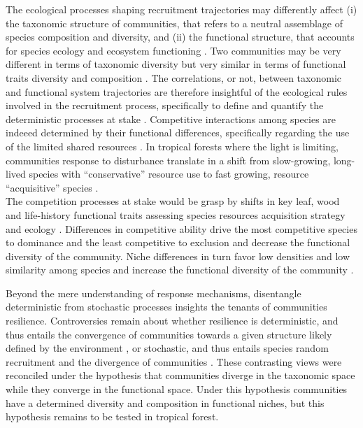 \documentclass[fleqn,10pt]{ArtEcoFoG} %
\begin{document}
The ecological processes shaping recruitment trajectories may differently
affect (i) the taxonomic structure of communities, that refers to a neutral
assemblage of species composition and diversity, and (ii) the functional
structure, that accounts for species ecology and ecosystem functioning
\citep{Violle2007b, Kunstler2016}. Two communities may be very different
in terms of taxonomic diversity but very similar in terms of functional
traits diversity and composition \citep{Villeger2012}. The correlations, or not,
between taxonomic and functional system trajectories are therefore insightful
of the ecological rules involved in the recruitment process, specifically to define and quantify
the deterministic processes at stake \citep{Mayfield2010, Fukami2005}.
Competitive interactions among species are indeeed determined by their
functional differences, specifically regarding the use of the limited
shared resources \citep{Webb2002, Perronne2017}. In tropical forests
where the light is limiting, communities response to disturbance
translate in a shift from slow-growing, long-lived species with
``conservative'' resource use to fast growing, resource ``acquisitive''
species \citep{Denslow1980, Molino2001, Bongers2009}.\\
The competition processes at stake would be grasp by shifts in key leaf,
wood and life-history functional traits assessing species resources
acquisition strategy and ecology
\citep{Wright2004, Chave2009b, Herault2011, Gerhold2015}. Differences in
competitive ability drive the most competitive species to dominance and
the least competitive to exclusion and decrease the functional diversity
of the community. Niche differences in turn favor low densities and low
similarity among species and increase the functional diversity of the
community \citep{Ackerly2003, McGill2006, Kunstler2012}.

Beyond the mere understanding of response mechanisms, disentangle
deterministic from stochastic processes insights the tenants of
communities resilience. Controversies remain about whether resilience is
deterministic, and thus entails the convergence of communities towards a
given structure likely defined by the environment \citep{Clements1916},
or stochastic, and thus entails species random recruitment and the
divergence of communities \citep{Diamond1975}. These contrasting views
were reconciled under the hypothesis that communities diverge in the
taxonomic space while they converge in the functional space. Under this
hypothesis communities have a determined diversity and composition in
functional niches, but this hypothesis remains to be tested in tropical
forest.
\end{document}

